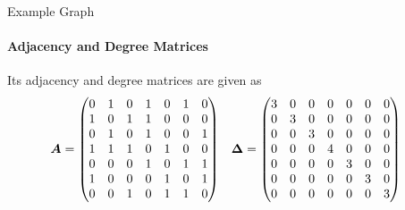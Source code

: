 \begin{frame}{Example Graph}
\framesubtitle{Adjacency and Degree Matrices}
\begin{figure}
    \centerline{
	}
 \end{figure}
 \small
    Its adjacency and degree matrices are given as
    \begin{align*}
        {\boldsymbol A} &= \begin{pmatrix} 0 & 1 & 0 & 1 & 0 & 1 & 0\\
                    1 & 0 & 1 & 1 & 0 & 0 & 0\\
                    0 & 1 & 0 & 1 & 0 & 0 & 1\\
                    1 & 1 & 1 & 0 & 1 & 0 & 0\\
                    0 & 0 & 0 & 1 & 0 & 1 & 1\\
                    1 & 0 & 0 & 0 & 1 & 0 & 1\\
                    0 & 0 & 1 & 0 & 1 & 1 & 0 \end{pmatrix} &
        {\bm \Delta} & = \begin{pmatrix} 
                3 & 0 & 0 & 0 & 0 & 0 & 0\\
                0 & 3 & 0 & 0 & 0 & 0 & 0\\
                0 & 0 & 3 & 0 & 0 & 0 & 0\\
                0 & 0 & 0 & 4 & 0 & 0 & 0\\
                0 & 0 & 0 & 0 & 3 & 0 & 0\\
                0 & 0 & 0 & 0 & 0 & 3 & 0\\
                0 & 0 & 0 & 0 & 0 & 0 & 3 \end{pmatrix}
    \end{align*}
\end{frame}


